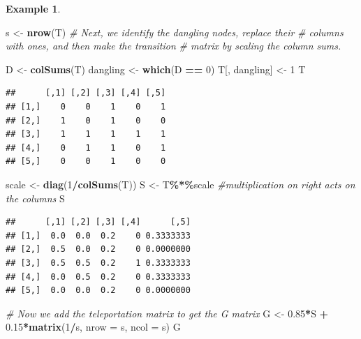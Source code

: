 \documentclass[
]{book}
\newenvironment{Shaded}{\begin{snugshade}}{\end{snugshade}}
\newcommand{\AttributeTok}[1]{\textcolor[rgb]{0.13,0.29,0.53}{#1}}
\newcommand{\CommentTok}[1]{\textcolor[rgb]{0.56,0.35,0.01}{\textit{#1}}}
\newcommand{\DecValTok}[1]{\textcolor[rgb]{0.00,0.00,0.81}{#1}}
\newcommand{\FloatTok}[1]{\textcolor[rgb]{0.00,0.00,0.81}{#1}}
\newcommand{\FunctionTok}[1]{\textcolor[rgb]{0.13,0.29,0.53}{\textbf{#1}}}
\newcommand{\NormalTok}[1]{#1}
\newcommand{\OtherTok}[1]{\textcolor[rgb]{0.56,0.35,0.01}{#1}}
\newcommand{\SpecialCharTok}[1]{\textcolor[rgb]{0.81,0.36,0.00}{\textbf{#1}}}
\theoremstyle{definition}
\theoremstyle{definition}
\newtheorem{example}{Example}[chapter]
\theoremstyle{definition}
\theoremstyle{definition}
\theoremstyle{remark}
\begin{document}
\begin{examplebox}
\begin{example}
\begin{Shaded}
\begin{Highlighting}[]
\NormalTok{s }\OtherTok{\textless{}{-}} \FunctionTok{nrow}\NormalTok{(T)}
\CommentTok{\# Next, we identify the dangling nodes, replace their}
\CommentTok{\# columns with ones, and then make the transition }
\CommentTok{\# matrix by scaling the column sums.}

\NormalTok{D }\OtherTok{\textless{}{-}} \FunctionTok{colSums}\NormalTok{(T)}
\NormalTok{dangling }\OtherTok{\textless{}{-}} \FunctionTok{which}\NormalTok{(D }\SpecialCharTok{==} \DecValTok{0}\NormalTok{)}
\NormalTok{T[, dangling] }\OtherTok{\textless{}{-}} \DecValTok{1}
\NormalTok{T}
\end{Highlighting}
\end{Shaded}

\begin{verbatim}
##      [,1] [,2] [,3] [,4] [,5]
## [1,]    0    0    1    0    1
## [2,]    1    0    1    0    0
## [3,]    1    1    1    1    1
## [4,]    0    1    1    0    1
## [5,]    0    0    1    0    0
\end{verbatim}

\begin{Shaded}
\begin{Highlighting}[]
\NormalTok{scale }\OtherTok{\textless{}{-}} \FunctionTok{diag}\NormalTok{(}\DecValTok{1}\SpecialCharTok{/}\FunctionTok{colSums}\NormalTok{(T))}
\NormalTok{S }\OtherTok{\textless{}{-}}\NormalTok{ T}\SpecialCharTok{\%*\%}\NormalTok{scale }\CommentTok{\#multiplication on right acts on the columns}
\NormalTok{S}
\end{Highlighting}
\end{Shaded}

\begin{verbatim}
##      [,1] [,2] [,3] [,4]      [,5]
## [1,]  0.0  0.0  0.2    0 0.3333333
## [2,]  0.5  0.0  0.2    0 0.0000000
## [3,]  0.5  0.5  0.2    1 0.3333333
## [4,]  0.0  0.5  0.2    0 0.3333333
## [5,]  0.0  0.0  0.2    0 0.0000000
\end{verbatim}

\begin{Shaded}
\begin{Highlighting}[]
\CommentTok{\# Now we add the teleportation matrix to get the G matrix}
\NormalTok{G }\OtherTok{\textless{}{-}} \FloatTok{0.85}\SpecialCharTok{*}\NormalTok{S }\SpecialCharTok{+} \FloatTok{0.15}\SpecialCharTok{*}\FunctionTok{matrix}\NormalTok{(}\DecValTok{1}\SpecialCharTok{/}\NormalTok{s, }\AttributeTok{nrow =}\NormalTok{ s, }\AttributeTok{ncol =}\NormalTok{ s) }
\NormalTok{G}
\end{Highlighting}
\end{Shaded}


\end{example}
\end{examplebox}
\end{document}
